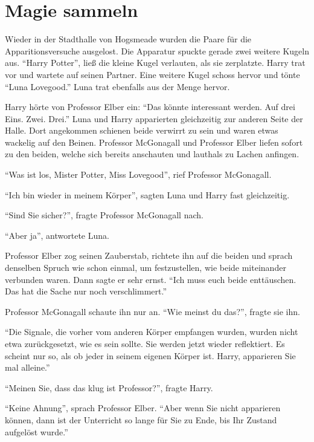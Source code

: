 \chapter{Magie sammeln}


Wieder in der Stadthalle von Hogsmeade wurden die Paare für die Apparitionsversuche ausgelost. Die Apparatur spuckte gerade zwei weitere Kugeln aus. \enquote{Harry Potter}, ließ die kleine Kugel verlauten, als sie zerplatzte. Harry trat vor und wartete auf seinen Partner. Eine weitere Kugel schoss hervor und tönte \enquote{Luna Lovegood.} Luna trat ebenfalls aus der Menge hervor.

Harry hörte von Professor Elber ein: \enquote{Das könnte interessant werden. Auf drei \gst Eins. Zwei. Drei.} Luna und Harry apparierten gleichzeitig zur anderen Seite der Halle. Dort angekommen schienen beide verwirrt zu sein und waren etwas wackelig auf den Beinen. Professor McGonagall und Professor Elber liefen sofort zu den beiden, welche sich bereits anschauten und lauthals zu Lachen anfingen.

\enquote{Was ist los, Mister Potter, Miss Lovegood}, rief Professor McGonagall.

\enquote{Ich bin wieder in meinem Körper}, sagten Luna und Harry fast gleichzeitig.

\enquote{Sind Sie sicher?}, fragte Professor McGonagall nach.

\enquote{Aber ja}, antwortete Luna.

Professor Elber zog seinen Zauberstab, richtete ihn auf die beiden und sprach denselben Spruch wie schon einmal, um festzustellen, wie beide miteinander verbunden waren. Dann sagte er sehr ernst. \enquote{Ich muss euch beide enttäuschen. Das hat die Sache nur noch verschlimmert.}

Professor McGonagall schaute ihn nur an. \enquote{Wie meinst du das?}, fragte sie ihn.

\enquote{Die Signale, die vorher vom anderen Körper empfangen wurden, wurden nicht etwa zurückgesetzt, wie es sein sollte. Sie werden jetzt wieder reflektiert. Es scheint nur so, als ob jeder in seinem eigenen Körper ist. \gst Harry, apparieren Sie mal alleine.}

\enquote{Meinen Sie, dass das klug ist Professor?}, fragte Harry.

\enquote{Keine Ahnung}, sprach Professor Elber. \enquote{Aber wenn Sie nicht apparieren können, dann ist der Unterricht so lange für Sie zu Ende, bis Ihr Zustand aufgelöst wurde.}

